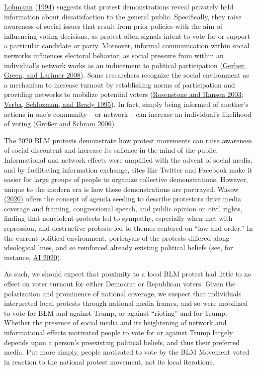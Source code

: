 \documentclass[
  12pt,
]{article}
\begin{document}
\protect\hyperlink{ref-Lohmann1994}{Lohmann} (\protect\hyperlink{ref-Lohmann1994}{1994}) suggests that protest demonstrations reveal privately held information about dissatisfaction to the general public. Specifically, they raise awareness of social issues that result from prior policies with the aim of influencing voting decisions, as protest often signals intent to vote for or support a particular candidate or party. Moreover, informal communication within social networks influences electoral behavior, as social pressure from within an individual's network works as an inducement to political participation (\protect\hyperlink{ref-Gerber2008}{Gerber, Green, and Larimer 2008}). Some researchers recognize the social environment as a mechanism to increase turnout by establishing norms of participation and providing networks to mobilize potential voters (\protect\hyperlink{ref-Rosenstone2003}{Rosenstone and Hansen 2003}; \protect\hyperlink{ref-Verba1995}{Verba, Schlozman, and Brady 1995}). In fact, simply being informed of another's actions in one's community -- or network -- can increase an individual's likelihood of voting (\protect\hyperlink{ref-Grosser2006}{Großer and Schram 2006}).

The 2020 BLM protests demonstrate how protest movements can raise awareness of social discontent and increase its salience in the mind of the public. Informational and network effects were amplified with the advent of social media, and by facilitating information exchange, sites like Twitter and Facebook make it easier for large groups of people to organize collective demonstrations. However, unique to the modern era is how these demonstrations are portrayed. Wasow (\protect\hyperlink{ref-Wasow2020}{2020}) offers the concept of agenda seeding to describe protestors drive media coverage and framing, congressional speech, and public opinion on civil rights, finding that nonviolent protests led to sympathy, especially when met with repression, and destructive protests led to themes centered on ``law and order.'' In the current political environment, portrayals of the protests differed along ideological lines, and so reinforced already existing political beliefs (see, for instance, \protect\hyperlink{ref-SignalAI2020}{AI 2020}).

As such, we should expect that proximity to a local BLM protest had little to no effect on voter turnout for either Democrat or Republican voters. Given the polarization and prominence of national coverage, we suspect that individuals interpreted local protests through national media frames, and so were mobilized to vote for BLM and against Trump, or against ``rioting'' and for Trump. Whether the presence of social media and its heightening of network and informational effects motivated people to vote for or against Trump largely depends upon a person's preexisting political beliefs, and thus their preferred media. Put more simply, people motivated to vote by the BLM Movement voted in reaction to the national protest movement, not its local iterations.
\end{document}
